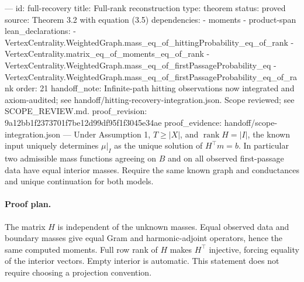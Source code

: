---
id: full-recovery
title: Full-rank reconstruction
type: theorem
status: proved
source: Theorem 3.2 with equation (3.5)
dependencies:
- moments
- product-span
lean_declarations:
- VertexCentrality.WeightedGraph.mass_eq_of_hittingProbability_eq_of_rank
- VertexCentrality.matrix_eq_of_moments_eq_of_rank
- VertexCentrality.WeightedGraph.mass_eq_of_firstPassageProbability_eq
- VertexCentrality.WeightedGraph.mass_eq_of_firstPassageProbability_eq_of_rank
order: 21
handoff_note: Infinite-path hitting observations now integrated and axiom-audited; see handoff/hitting-recovery-integration.json. Scope reviewed; see SCOPE_REVIEW.md.
proof_revision: 9a12bb1f2373701f7be12d99df95f1f3045e34ae
proof_evidence: handoff/scope-integration.json
---
Under Assumption 1, $T\geq|X|$, and $\operatorname{rank}H=|I|$, the known input uniquely determines $\mu|_I$ as the unique solution of $H^\top m=b$. In particular two admissible mass functions agreeing on $B$ and on all observed first-passage data have equal interior masses. Require the same known graph and conductances and unique continuation for both models.

\paragraph{Proof plan.}
The matrix $H$ is independent of the unknown masses. Equal observed data and boundary masses give equal Gram and harmonic-adjoint operators, hence the same computed moments. Full row rank of $H$ makes $H^\top$ injective, forcing equality of the interior vectors. Empty interior is automatic. This statement does not require choosing a projection convention.
